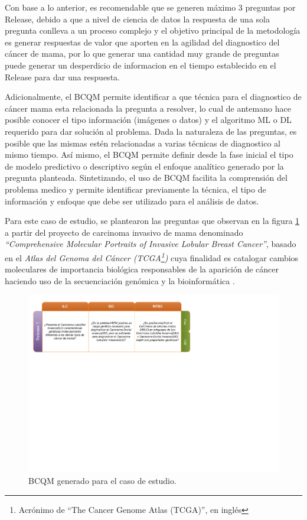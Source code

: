  Con base a lo anterior, es recomendable que se generen máximo 3 preguntas por Release, debido a que a nivel de ciencia de datos la respuesta de una sola pregunta conlleva a un proceso complejo y el objetivo principal de la metodología es generar respuestas de valor que aporten en la agilidad del diagnostico del cáncer de mama, por lo que generar una cantidad muy grande de preguntas puede generar un desperdicio de informacion en el tiempo establecido en el Release para dar una respuesta.
 
 Adicionalmente, el BCQM permite identificar a que técnica para el diagnostico de cáncer mama esta relacionada la pregunta a resolver, lo cual de antemano hace posible conocer el tipo información (imágenes o datos) y el algoritmo  ML o DL requerido para dar solución al problema. Dada la naturaleza de las preguntas, es posible  que las mismas estén relacionadas a varias técnicas de diagnostico al mismo tiempo. Así mismo, el BCQM permite definir desde la fase inicial el tipo de modelo predictivo o descriptivo según el enfoque analítico generado por la pregunta planteada. Sintetizando, el uso de BCQM facilita la comprensión del problema medico y permite identificar previamente la técnica, el tipo de información y enfoque que debe ser utilizado para el análisis de datos.  

Para este caso de estudio, se plantearon las preguntas que observan en la figura \ref{BCQ_TCGA} a partir del proyecto de carcinoma invasivo de mama denominado \textit{“Comprehensive Molecular Portraits of Invasive Lobular Breast Cancer”}\cite{Ciriello2015}, basado en el \textit {Atlas del Genoma del Cáncer (TCGA\footnote{Acrónimo de “The Cancer Genome Atlas (TCGA)”, en inglés })} cuya finalidad es catalogar cambios moleculares de importancia biológica responsables de la aparición de cáncer haciendo uso de la secuenciación genómica y la bioinformática \cite{TCGA2023}.
\begin{figure}
	\centering
	\includegraphics[width=1
	\linewidth]{IMAGENES/BCQM_TCGA}
	\caption{BCQM generado para el caso de estudio.}
	\label{BCQ_TCGA}
\end{figure}

